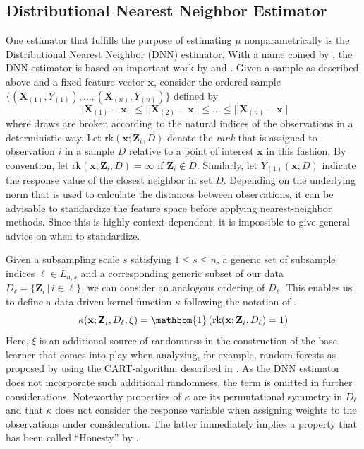 \documentclass[letterpaper,10pt]{article}
\numberwithin{equation}{section}
\numberwithin{thm}{section}
\numberwithin{lem}{section}
\numberwithin{cor}{section}
\newcommand{\1}{\mathbbm{1}}
\newcommand{\rk}{\text{rk}}
\begin{document}
\subsection{Distributional Nearest Neighbor Estimator}
One estimator that fulfills the purpose of estimating $\mu$ nonparametrically is the Distributional Nearest Neighbor (DNN) estimator.
With a name coined by \citet{demirkaya_optimal_2024}, the DNN estimator is based on important work by \citet{steele_exact_2009} and \citet{biau_rate_2010}.
Given a sample as described above and a fixed feature vector $\mathbf{x}$, consider the ordered sample $\{(\mathbf{X}_{(1)}, Y_{(1)}), \dotsc, (\mathbf{X}_{(n)}, Y_{(n)})\}$ defined by
\begin{equation}\label{ordering}
	||\mathbf{X}_{(1)} - \mathbf{x}|| \leq ||\mathbf{X}_{(2)} - \mathbf{x}|| \leq \dotsc \leq ||\mathbf{X}_{(n)} - \mathbf{x}||
\end{equation}
where draws are broken according to the natural indices of the observations in a deterministic way.
Let $\rk(\mathbf{x}; \mathbf{Z}_i, D)$ denote the \textit{rank} that is assigned to observation $i$ in a sample $D$ relative to a point of interest $\mathbf{x}$ in this fashion.
By convention, let $\rk(\mathbf{x}; \mathbf{Z}_i, D) = \infty$ if $\mathbf{Z}_i \not\in D$.
Similarly, let $Y_{(1)}(\mathbf{x}; D)$ indicate the response value of the closest neighbor in set $D$.
Depending on the underlying norm that is used to calculate the distances between observations, it can be advisable to standardize the feature space before applying nearest-neighbor methods.
Since this is highly context-dependent, it is impossible to give general advice on when to standardize.

Given a subsampling scale $s$ satisfying $1 \leq s \leq n$, a generic set of subsample indices $\ell \in L_{n,s}$ and a corresponding generic subset of our data $D_{\ell} = \{\mathbf{Z}_i \, | \, i \in \ell\}$, we can consider an analogous ordering of $D_{\ell}$.
This enables us to define a data-driven kernel function $\kappa$ following the notation of \citet{ritzwoller_uniform_2024}.
\begin{equation}
	\kappa(\mathbf{x}; \mathbf{Z}_i, D_{\ell}, \xi)
	= \1\left(\rk(\mathbf{x}; \mathbf{Z}_i, D_{\ell}) = 1\right)
\end{equation}
Here, $\xi$ is an additional source of randomness in the construction of the base learner that comes into play when analyzing, for example, random forests as proposed by \citet{breiman_random_2001} using the CART-algorithm described in \citet{breiman_classification_2017}.
As the DNN estimator does not incorporate such additional randomness, the term is omitted in further considerations.
Noteworthy properties of $\kappa$ are its permutational symmetry in $D_{\ell}$ and that $\kappa$ does not consider the response variable when assigning weights to the observations under consideration.
The latter immediately implies a property that has been called ``Honesty'' by \citet{wager_estimation_2018}.
\end{document}
